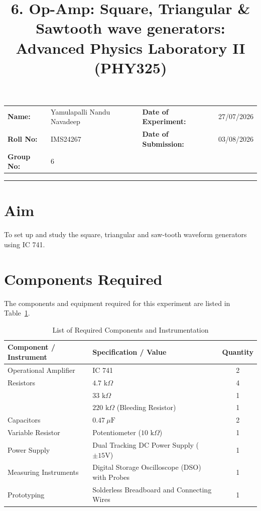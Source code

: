 \documentclass[11pt,a4paper]{article}
\title{
    \vspace{-1.5cm}
    \textbf{\Large 6. Op-Amp: Square, Triangular \& Sawtooth wave generators:} \\
    \vspace{0.3cm}
    \large Advanced Physics Laboratory II (PHY325)
}
\author{}
\date{}
\begin{document}
\maketitle
\vspace{-1.5cm}
\begin{center}
    \renewcommand{\arraystretch}{1.2}
    \begin{tabular}{ll@{\hspace{1cm}}ll}
        \textbf{Name:} & Yamulapalli Nandu Navadeep & \textbf{Date of Experiment:} & 27/07/2026 \\
        \textbf{Roll No:} & IMS24267 & \textbf{Date of Submission:} & 03/08/2026 \\
        \textbf{Group No:} & 6 & & \\
    \end{tabular}
\end{center}
\vspace{0.3cm}
\hrule
\vspace{0.3cm}

\section{Aim}
To set up and study the square, triangular and saw-tooth waveform generators using IC 741.
\section{Components Required}
The components and equipment required for this experiment are listed in Table~\ref{tab:components}.

\begin{table}[H]
\centering
\caption{List of Required Components and Instrumentation}
\label{tab:components}
\begin{tabular}{llc}
\toprule
\textbf{Component / Instrument} & \textbf{Specification / Value} & \textbf{Quantity} \\
\midrule
Operational Amplifier & IC 741 & 2 \\
Resistors & $4.7\text{ k}\Omega$ & 4 \\
 & $33\text{ k}\Omega$ & 1 \\
 & $220\text{ k}\Omega$ (Bleeding Resistor) & 1 \\
Capacitors & $0.47\ \mu\text{F}$ & 2 \\
Variable Resistor & Potentiometer ($10\text{ k}\Omega$) & 1 \\
Power Supply & Dual Tracking DC Power Supply ($\pm 15\text{V}$) & 1 \\
Measuring Instruments & Digital Storage Oscilloscope (DSO) with Probes & 1 \\
Prototyping & Solderless Breadboard and Connecting Wires & 1 \\
\bottomrule
\end{tabular}
\end{table}
\end{document}
